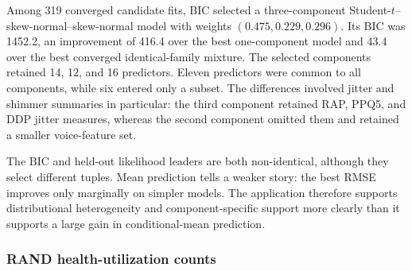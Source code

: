 \documentclass[11pt]{article}
\begin{document}
Among 319 converged candidate fits, BIC selected a three-component
Student-$t$--skew-normal--skew-normal model with weights
\((0.475,0.229,0.296)\).  Its BIC was 1452.2, an improvement of 416.4 over
the best one-component model and 43.4 over the best converged identical-family
mixture.  The selected components retained 14, 12, and 16 predictors.  Eleven
predictors were common to all components, while six entered only a subset.
The differences involved jitter and shimmer summaries in particular: the third
component retained RAP, PPQ5, and DDP jitter measures, whereas the second
component omitted them and retained a smaller voice-feature set.

\begin{table}[t]
\centering
\caption{Parkinson's analysis: representative converged models.  SN denotes
skew normal.  Log score, RMSE, and MAE are evaluated on 1,000 held-out
recordings.}
\label{tab:parkinsons}
\small
{}
\end{table}

The BIC and held-out likelihood leaders are both non-identical, although they
select different tuples.  Mean prediction tells a weaker story: the best RMSE
improves only marginally on simpler models.  The application therefore supports
distributional heterogeneity and component-specific support more clearly than
it supports a large gain in conditional-mean prediction.

\subsubsection{RAND health-utilization counts}
\end{document}
